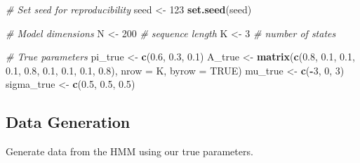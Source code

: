 \documentclass[
]{article}
\newenvironment{Shaded}{\begin{snugshade}}{\end{snugshade}}
\newcommand{\AttributeTok}[1]{\textcolor[rgb]{0.13,0.29,0.53}{#1}}
\newcommand{\CommentTok}[1]{\textcolor[rgb]{0.56,0.35,0.01}{\textit{#1}}}
\newcommand{\ConstantTok}[1]{\textcolor[rgb]{0.56,0.35,0.01}{#1}}
\newcommand{\DecValTok}[1]{\textcolor[rgb]{0.00,0.00,0.81}{#1}}
\newcommand{\FloatTok}[1]{\textcolor[rgb]{0.00,0.00,0.81}{#1}}
\newcommand{\FunctionTok}[1]{\textcolor[rgb]{0.13,0.29,0.53}{\textbf{#1}}}
\newcommand{\NormalTok}[1]{#1}
\newcommand{\OtherTok}[1]{\textcolor[rgb]{0.56,0.35,0.01}{#1}}
\newcommand{\SpecialCharTok}[1]{\textcolor[rgb]{0.81,0.36,0.00}{\textbf{#1}}}
\begin{document}
\begin{Shaded}
\begin{Highlighting}[]
\CommentTok{\# Set seed for reproducibility}
\NormalTok{seed }\OtherTok{\textless{}{-}} \DecValTok{123}
\FunctionTok{set.seed}\NormalTok{(seed)}

\CommentTok{\# Model dimensions}
\NormalTok{N }\OtherTok{\textless{}{-}} \DecValTok{200}  \CommentTok{\# sequence length}
\NormalTok{K }\OtherTok{\textless{}{-}} \DecValTok{3}    \CommentTok{\# number of states}

\CommentTok{\# True parameters}
\NormalTok{pi\_true }\OtherTok{\textless{}{-}} \FunctionTok{c}\NormalTok{(}\FloatTok{0.6}\NormalTok{, }\FloatTok{0.3}\NormalTok{, }\FloatTok{0.1}\NormalTok{)}
\NormalTok{A\_true }\OtherTok{\textless{}{-}} \FunctionTok{matrix}\NormalTok{(}\FunctionTok{c}\NormalTok{(}\FloatTok{0.8}\NormalTok{, }\FloatTok{0.1}\NormalTok{, }\FloatTok{0.1}\NormalTok{,}
                   \FloatTok{0.1}\NormalTok{, }\FloatTok{0.8}\NormalTok{, }\FloatTok{0.1}\NormalTok{,}
                   \FloatTok{0.1}\NormalTok{, }\FloatTok{0.1}\NormalTok{, }\FloatTok{0.8}\NormalTok{),}
                 \AttributeTok{nrow =}\NormalTok{ K, }\AttributeTok{byrow =} \ConstantTok{TRUE}\NormalTok{)}
\NormalTok{mu\_true }\OtherTok{\textless{}{-}} \FunctionTok{c}\NormalTok{(}\SpecialCharTok{{-}}\DecValTok{3}\NormalTok{, }\DecValTok{0}\NormalTok{, }\DecValTok{3}\NormalTok{)}
\NormalTok{sigma\_true }\OtherTok{\textless{}{-}} \FunctionTok{c}\NormalTok{(}\FloatTok{0.5}\NormalTok{, }\FloatTok{0.5}\NormalTok{, }\FloatTok{0.5}\NormalTok{)}
\end{Highlighting}
\end{Shaded}

\subsection{Data Generation}\label{data-generation}

Generate data from the HMM using our true parameters.

\begin{Shaded}
\end{Shaded}
\end{document}
